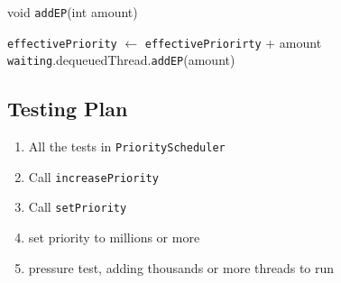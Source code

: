 \documentclass{article}
\begin{document}
\begin{spacing}{1.1}
\begin{algorithm}[htbp]
  \caption{void \texttt{addEP}(int amount)}
\begin{algorithmic}[1]
  \State  \texttt{effectivePriority} $\leftarrow$ \texttt{effectivePriorirty} + amount
  \State \texttt{waiting}.dequeuedThread.\texttt{addEP}(amount)
\end{algorithmic}
\end{algorithm}


\subsection{Testing Plan}
\begin{enumerate}
\item All the tests in \texttt{PriorityScheduler}
\item Call \texttt{increasePriority}
\item Call \texttt{setPriority}
\item set priority to millions or more
\item pressure test, adding thousands or more threads to run
\end{enumerate}

\end{spacing}
\end{document}
